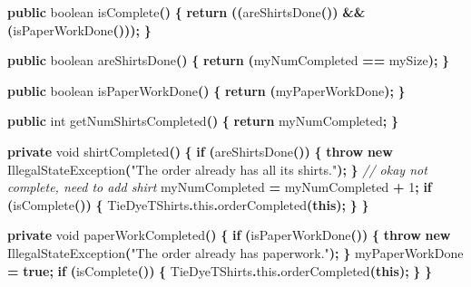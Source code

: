 \documentclass[
]{book}
\newenvironment{Shaded}{\begin{snugshade}}{\end{snugshade}}
\newcommand{\BuiltInTok}[1]{#1}
\newcommand{\CommentTok}[1]{\textcolor[rgb]{0.56,0.35,0.01}{\textit{#1}}}
\newcommand{\ControlFlowTok}[1]{\textcolor[rgb]{0.13,0.29,0.53}{\textbf{#1}}}
\newcommand{\DataTypeTok}[1]{\textcolor[rgb]{0.13,0.29,0.53}{#1}}
\newcommand{\DecValTok}[1]{\textcolor[rgb]{0.00,0.00,0.81}{#1}}
\newcommand{\FunctionTok}[1]{\textcolor[rgb]{0.00,0.00,0.00}{#1}}
\newcommand{\KeywordTok}[1]{\textcolor[rgb]{0.13,0.29,0.53}{\textbf{#1}}}
\newcommand{\NormalTok}[1]{#1}
\newcommand{\OperatorTok}[1]{\textcolor[rgb]{0.81,0.36,0.00}{\textbf{#1}}}
\newcommand{\StringTok}[1]{\textcolor[rgb]{0.31,0.60,0.02}{#1}}
\theoremstyle{definition}
\theoremstyle{definition}
\theoremstyle{definition}
\theoremstyle{definition}
\theoremstyle{remark}
\begin{document}
\begin{Shaded}
\begin{Highlighting}[]
        \KeywordTok{public} \DataTypeTok{boolean} \FunctionTok{isComplete}\OperatorTok{()} \OperatorTok{\{}
            \ControlFlowTok{return} \OperatorTok{((}\FunctionTok{areShirtsDone}\OperatorTok{())} \OperatorTok{\&\&} \OperatorTok{(}\FunctionTok{isPaperWorkDone}\OperatorTok{()));}
        \OperatorTok{\}}

        \KeywordTok{public} \DataTypeTok{boolean} \FunctionTok{areShirtsDone}\OperatorTok{()} \OperatorTok{\{}
            \ControlFlowTok{return} \OperatorTok{(}\NormalTok{myNumCompleted }\OperatorTok{==}\NormalTok{ mySize}\OperatorTok{);}
        \OperatorTok{\}}

        \KeywordTok{public} \DataTypeTok{boolean} \FunctionTok{isPaperWorkDone}\OperatorTok{()} \OperatorTok{\{}
            \ControlFlowTok{return} \OperatorTok{(}\NormalTok{myPaperWorkDone}\OperatorTok{);}
        \OperatorTok{\}}

        \KeywordTok{public} \DataTypeTok{int} \FunctionTok{getNumShirtsCompleted}\OperatorTok{()} \OperatorTok{\{}
            \ControlFlowTok{return}\NormalTok{ myNumCompleted}\OperatorTok{;}
        \OperatorTok{\}}

        \KeywordTok{private} \DataTypeTok{void} \FunctionTok{shirtCompleted}\OperatorTok{()} \OperatorTok{\{}
            \ControlFlowTok{if} \OperatorTok{(}\FunctionTok{areShirtsDone}\OperatorTok{())} \OperatorTok{\{}
                \ControlFlowTok{throw} \KeywordTok{new} \BuiltInTok{IllegalStateException}\OperatorTok{(}\StringTok{"The order already has all its shirts."}\OperatorTok{);}
            \OperatorTok{\}}
            \CommentTok{// okay not complete, need to add shirt}
\NormalTok{            myNumCompleted }\OperatorTok{=}\NormalTok{ myNumCompleted }\OperatorTok{+} \DecValTok{1}\OperatorTok{;}
            \ControlFlowTok{if} \OperatorTok{(}\FunctionTok{isComplete}\OperatorTok{())} \OperatorTok{\{}
\NormalTok{                TieDyeTShirts}\OperatorTok{.}\FunctionTok{this}\OperatorTok{.}\FunctionTok{orderCompleted}\OperatorTok{(}\KeywordTok{this}\OperatorTok{);}
            \OperatorTok{\}}
        \OperatorTok{\}}

        \KeywordTok{private} \DataTypeTok{void} \FunctionTok{paperWorkCompleted}\OperatorTok{()} \OperatorTok{\{}
            \ControlFlowTok{if} \OperatorTok{(}\FunctionTok{isPaperWorkDone}\OperatorTok{())} \OperatorTok{\{}
                \ControlFlowTok{throw} \KeywordTok{new} \BuiltInTok{IllegalStateException}\OperatorTok{(}\StringTok{"The order already has paperwork."}\OperatorTok{);}
            \OperatorTok{\}}
\NormalTok{            myPaperWorkDone }\OperatorTok{=} \KeywordTok{true}\OperatorTok{;}
            \ControlFlowTok{if} \OperatorTok{(}\FunctionTok{isComplete}\OperatorTok{())} \OperatorTok{\{}
\NormalTok{                TieDyeTShirts}\OperatorTok{.}\FunctionTok{this}\OperatorTok{.}\FunctionTok{orderCompleted}\OperatorTok{(}\KeywordTok{this}\OperatorTok{);}
            \OperatorTok{\}}
        \OperatorTok{\}}
\end{Highlighting}
\end{Shaded}
\end{document}
